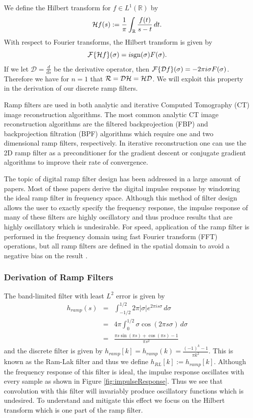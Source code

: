We define the Hilbert transform for $f \in L^1(\mathbb{R})$ by
\begin{eqnarray}
\mathcal{H} f(s) := \frac{1}{\pi}\int_\mathbb{R} \frac{f(t)}{s-t} \, dt.
\end{eqnarray}
With respect to Fourier transforms, the Hilbert transform is given by $$\mathcal{F} \{\mathcal{H} f\}(\sigma) = i\text{sgn}(\sigma)F(\sigma).$$  If we let $\mathcal{D} = \frac{d}{ds}$ be the derivative operator, then $\mathcal{F} \{\mathcal{D} f\}(\sigma) = -2\pi i\sigma F(\sigma)$.  Therefore we have for $n = 1$ that $\mathcal{R} = \mathcal{D}\mathcal{H} = \mathcal{H}\mathcal{D}$.  We will exploit this property in the derivation of our discrete ramp filters.

Ramp filters are used in both analytic and iterative Computed Tomography (CT) image reconstruction algorithms.  The most common analytic CT image reconstruction algorithms are the filtered backprojection (FBP) and backprojection filtration (BPF) algorithms which require one and two dimensional ramp filters, respectively.  In iterative reconstruction one can use the 2D ramp filter as a preconditioner for the gradient descent or conjugate gradient algorithms to improve their rate of convergence.

The topic of digital ramp filter design has been addressed in a large amount of papers.  Most of these papers derive the digital impulse response by windowing the ideal ramp filter in frequency space.  Although this method of filter design allows the user to exactly specify the frequency response, the impulse response of many of these filters are highly oscillatory and thus produce results that are highly oscillatory which is undesirable.  For speed, application of the ramp filter is performed in the frequency domain using fast Fourier transform (FFT) operations, but all ramp filters are defined in the spatial domain to avoid a negative bias on the result \cite{Crawford_TMI_1991}.


\subsubsection{Derivation of Ramp Filters} \label{subset:rampFilterDevelopment}

The band-limited filter with least $L^2$ error is given by
\begin{eqnarray*}
h_{ramp}(s) &=& \int_{-1/2}^{1/2} 2\pi|\sigma| e^{2\pi i s\sigma} \, d\sigma \\
&=& 4\pi \int_0^{1/2} \sigma \cos(2\pi s \sigma) \, d\sigma \\
&=& \frac{\pi s\sin(\pi s) + \cos(\pi s) - 1}{\pi s^2}
\end{eqnarray*}
and the discrete filter is given by $h_{ramp}[k] = h_{ramp}(k) = \frac{(-1)^k-1}{\pi k^2}$.  This is known as the Ram-Lak filter and thus we define $h_{RL}[k] := h_{ramp}[k]$.  Although the frequency response of this filter is ideal, the impulse response oscillates with every sample as shown in Figure \ref{fig:impulseResponse}.  Thus we see that convolution with this filter will invariably produce oscillatory functions which is undesired.  To understand and mitigate this effect we focus on the Hilbert transform which is one part of the ramp filter.  

